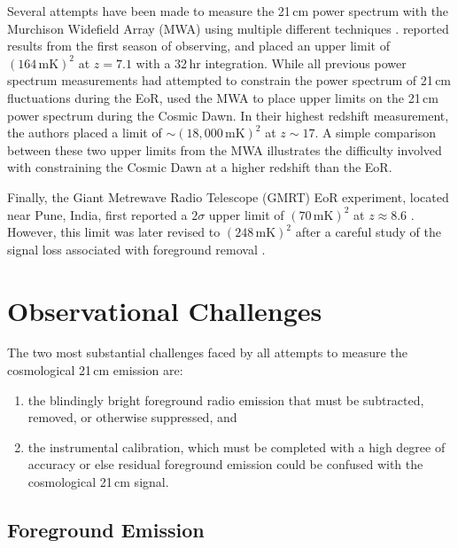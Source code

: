\begin{bibunit}
Several attempts have been made to measure the 21\,cm power spectrum with the Murchison Widefield
Array (MWA) using multiple different techniques \citep{2016ApJ...825..114J}.
\citet{2016ApJ...833..102B} reported results from the first season of observing, and placed an upper
limit of $(164\,\text{mK})^2$ at $z=7.1$ with a 32\,hr integration.  While all previous power
spectrum measurements had attempted to constrain the power spectrum of 21\,cm fluctuations during
the EoR, \citet{2016MNRAS.460.4320E} used the MWA to place upper limits on the 21\,cm power spectrum
during the Cosmic Dawn.  In their highest redshift measurement, the authors placed a limit of $\sim
(18,000\,\text{mK})^2$ at $z\sim 17$. A simple comparison between these two upper limits from the
MWA illustrates the difficulty involved with constraining the Cosmic Dawn at a higher redshift than
the EoR.

Finally, the Giant Metrewave Radio Telescope (GMRT) EoR experiment, located near Pune, India, first
reported a $2\sigma$ upper limit of $(70\,\text{mK})^2$ at $z \approx 8.6$
\citep{2011MNRAS.413.1174P}.  However, this limit was later revised to $(248\,\text{mK})^2$ after a
careful study of the signal loss associated with foreground removal \citep{2013MNRAS.433..639P}.

\section{Observational Challenges}

The two most substantial challenges faced by all attempts to measure the cosmological 21\,cm
emission are:
\begin{enumerate}
    \item
        the blindingly bright foreground radio emission that must be subtracted, removed, or
        otherwise suppressed, and
    \item
        the instrumental calibration, which must be completed with a high degree of accuracy or else
        residual foreground emission could be confused with the cosmological 21\,cm signal.
\end{enumerate}

\subsection{Foreground Emission}


\end{bibunit}

